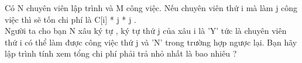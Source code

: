 Có N chuyên viên lập trình và M công việc. Nếu chuyên viên thứ i mà làm j công việc thì sẽ tốn chi phí là C[i] * j * j .   
\\   Người ta cho bạn N xâu ký tự , ký tự thứ j của xâu i là 'Y' tức là chuyên viên thứ i có thể làm được công việc thứ j và 'N' trong trường hợp ngược lại. Bạn hãy lập trình tính xem tổng chi phí phải trả nhỏ nhất là bao nhiêu ?